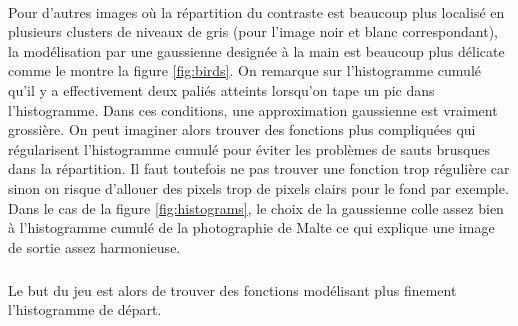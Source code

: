 \documentclass{article}
\begin{document}
\paragraph*{}
Pour d'autres images où la répartition du contraste est beaucoup plus localisé en plusieurs clusters de niveaux de gris (pour l'image noir et blanc correspondant), la modélisation par une gaussienne designée à la main est beaucoup plus délicate comme le montre la figure \ref{fig:birds}. On remarque sur l'histogramme cumulé qu'il y a effectivement deux paliés atteints lorsqu'on tape un pic dans l'histogramme. Dans ces conditions, une approximation gaussienne est vraiment grossière. On peut imaginer alors trouver des fonctions plus compliquées qui régularisent l'histogramme cumulé pour éviter les problèmes de sauts brusques dans la répartition. Il faut toutefois ne pas trouver une fonction trop régulière car sinon on risque d'allouer des pixels trop de pixels clairs pour le fond par exemple. Dans le cas de la figure \ref{fig:histograms}, le choix de la gaussienne colle assez bien à l'histogramme cumulé de la photographie de Malte ce qui explique une image de sortie assez harmonieuse.
\subparagraph*{}
Le but du jeu est alors de trouver des fonctions modélisant plus finement l'histogramme de départ.
\end{document}
